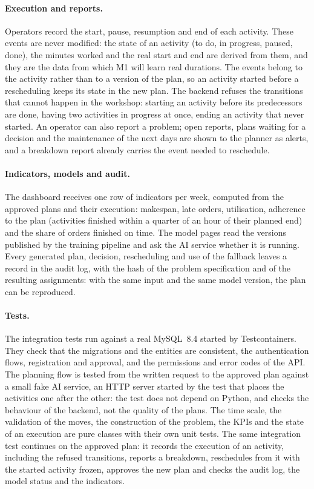\paragraph{Execution and reports.} Operators record the start, pause, resumption and end of each
activity. These events are never modified: the state of an activity (to do, in progress, paused,
done), the minutes worked and the real start and end are derived from them, and they are the
data from which M1 will learn real durations. The events belong to the activity rather than to
a version of the plan, so an activity started before a rescheduling keeps its state in the new
plan. The backend refuses the transitions that cannot happen in the workshop: starting an
activity before its predecessors are done, having two activities in progress at once, ending an
activity that never started. An operator can also report a problem; open reports, plans waiting
for a decision and the maintenance of the next days are shown to the planner as alerts, and a
breakdown report already carries the event needed to reschedule.

\paragraph{Indicators, models and audit.} The dashboard receives one row of indicators per week,
computed from the approved plans and their execution: makespan, late orders, utilisation,
adherence to the plan (activities finished within a quarter of an hour of their planned end)
and the share of orders finished on time. The model pages read the versions published by the
training pipeline and ask the AI service whether it is running. Every generated plan,
decision, rescheduling and use of the fallback leaves a record in the audit log, with the hash
of the problem specification and of the resulting assignments: with the same input and the same
model version, the plan can be reproduced.

\paragraph{Tests.} The integration tests run against a real MySQL~8.4 started by Testcontainers.
They check that the migrations and the entities are consistent, the authentication flows,
registration and approval, and the permissions and error codes of the API. The planning flow is
tested from the written request to the approved plan against a small fake AI service, an HTTP
server started by the test that places the activities one after the other: the test does not
depend on Python, and checks the behaviour of the backend, not the quality of the plans. The
time scale, the validation of the moves, the construction of the problem, the KPIs and the state
of an execution are pure classes with their own unit tests. The same integration test continues
on the approved plan: it records the execution of an activity, including the refused
transitions, reports a breakdown, reschedules from it with the started activity frozen, approves
the new plan and checks the audit log, the model status and the indicators.

